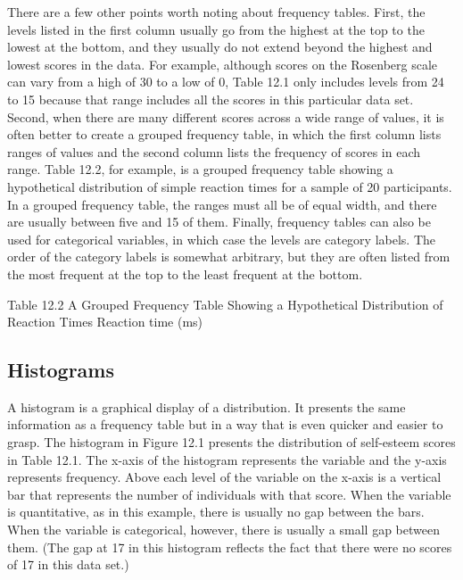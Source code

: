 There are a few other points worth noting about frequency tables. First, the levels listed in the first column usually go from the highest at the top to the lowest at the bottom, and they usually do not extend beyond the highest and lowest scores in the data. For example, although scores on the Rosenberg scale can vary from a high of 30 to a low of 0, Table 12.1 only includes levels from 24 to 15 because that range includes all the scores in this particular data set. Second, when there are many different scores across a wide range of values, it is often better to create a grouped frequency table, in which the first column lists ranges of values and the second column lists the frequency of scores in each range. Table 12.2, for example, is a grouped frequency table showing a hypothetical distribution of simple reaction times for a sample of 20 participants. In a grouped frequency table, the ranges must all be of equal width, and there are usually between five and 15 of them. Finally, frequency tables can also be used for categorical variables, in which case the levels are category labels. The order of the category labels is somewhat arbitrary, but they are often listed from the most frequent at the top to the least frequent at the bottom.


Table 12.2 A Grouped Frequency Table Showing a Hypothetical Distribution of Reaction Times
 Reaction time (ms)



\subsection{Histograms}

A histogram is a graphical display of a distribution. It presents the same information as a frequency table but in a way that is even quicker and easier to grasp. The histogram in Figure 12.1 presents the distribution of self-esteem scores in Table 12.1. The x-axis of the histogram represents the variable and the y-axis represents frequency. Above each level of the variable on the x-axis is a vertical bar that represents the number of individuals with that score. When the variable is quantitative, as in this example, there is usually no gap between the bars. When the variable is categorical, however, there is usually a small gap between them. (The gap at 17 in this histogram reflects the fact that there were no scores of 17 in this data set.)


